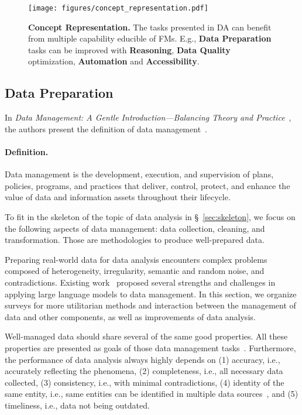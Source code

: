   \begin{figure}
    \centering
    \texttt{[image: figures/concept\_representation.pdf]}
    \caption{\textbf{Concept Representation.} The tasks presented in DA can benefit from multiple capability educible of FMs. E.g., \textbf{Data Preparation} tasks can be improved with \textbf{Reasoning}, \textbf{Data Quality} optimization, \textbf{Automation} and \textbf{Accessibility}.}
    \label{fig:concept_representation}
  \end{figure}
  
  \subsection{Data Preparation}\label{sec:data_management}
  
  In \textit{Data Management: A Gentle Introduction—Balancing Theory and Practice}~\cite{van2020data}, the authors present the definition of data management~\cite{international2017dama}.
  
  \paragraph{Definition.} Data management is the development, execution, and supervision of plans, policies, programs, and practices that deliver, control, protect, and enhance the value of data and information assets throughout their lifecycle.
  
  To fit in the skeleton of the topic of data analysis in \S~\ref{sec:skeleton}, we focus on the following aspects of data management: data collection, cleaning, and transformation. Those are methodologies to produce well-prepared data.
  
  Preparing real-world data for data analysis encounters complex problems composed of heterogeneity, irregularity, semantic and random noise, and contradictions. Existing work~\cite{fernandez2023large} proposed several strengths and challenges in applying large language models to data management. In this section, we organize surveys for more utilitarian methods and interaction between the management of data and other components, as well as improvements of data analysis. 
  
  
  Well-managed data should share several of the same good properties. All these properties are presented as goals of those data management tasks~\cite{wang1996beyond}. Furthermore, the performance of data analysis always highly depends on (1) accuracy, i.e., accurately reflecting the phenomena, (2) completeness, i.e., all necessary data collected, (3) consistency, i.e., with minimal contradictions, (4) identity of the same entity, i.e., same entities can be identified in multiple data sources~\cite{khoshafian1986object}, and (5) timeliness, i.e., data not being outdated. 
  
